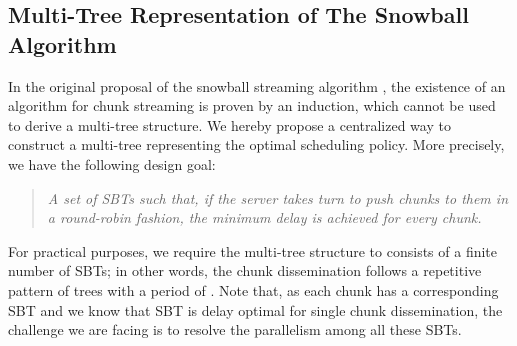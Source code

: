 \documentclass[conference]{IEEEtran}
\begin{document}
\subsection{Multi-Tree Representation of The Snowball Algorithm}
In the original proposal of the snowball streaming algorithm \cite{Liu-MM07}, the existence of an algorithm for chunk streaming is proven by an induction, which cannot be used to derive a multi-tree structure. We hereby propose a centralized way to construct a multi-tree representing the optimal scheduling policy. More precisely, we have the following design goal:
\begin{quote} \textit{A set of SBTs such that, if the server takes turn to push chunks to them in a round-robin fashion, the minimum delay is achieved for every chunk.}
  \end{quote}
For practical purposes, we require the multi-tree structure to consists of a finite number of SBTs; in other words, the chunk dissemination follows a repetitive pattern of trees with a period of \framebox{}. Note that, as each chunk has a corresponding SBT and we know that SBT is delay optimal for single chunk dissemination, the challenge we are facing is to resolve the parallelism among all these  SBTs.
\end{document}
